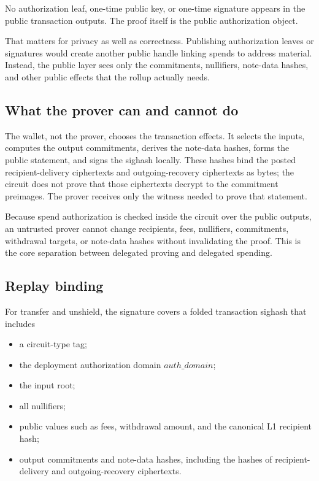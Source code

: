\documentclass[11pt]{article}
\begin{document}
No authorization leaf, one-time public key, or one-time signature appears in the
public transaction outputs. The proof itself is the public authorization object.

That matters for privacy as well as correctness. Publishing authorization leaves
or signatures would create another public handle linking spends to address
material. Instead, the public layer sees only the commitments, nullifiers,
note-data hashes, and other public effects that the rollup actually needs.

\subsection{What the prover can and cannot do}

The wallet, not the prover, chooses the transaction effects. It selects the
inputs, computes the output commitments, derives the note-data hashes, forms
the public statement, and signs the sighash locally. These hashes bind the
posted recipient-delivery ciphertexts and outgoing-recovery ciphertexts as
bytes; the circuit does not prove that those ciphertexts decrypt to the
commitment preimages. The prover receives only the witness needed to prove that
statement.

Because spend authorization is checked inside the circuit over the public
outputs, an untrusted prover cannot change recipients, fees, nullifiers,
commitments, withdrawal targets, or note-data hashes without invalidating the
proof. This is the core separation between delegated proving and delegated
spending.

\subsection{Replay binding}

For transfer and unshield, the signature covers a folded transaction sighash
that includes

\begin{itemize}
  \item a circuit-type tag;
  \item the deployment authorization domain \(auth\_domain\);
  \item the input root;
  \item all nullifiers;
  \item public values such as fees, withdrawal amount, and the canonical L1
        recipient hash;
  \item output commitments and note-data hashes, including the hashes of
        recipient-delivery and outgoing-recovery ciphertexts.
\end{itemize}
\end{document}
